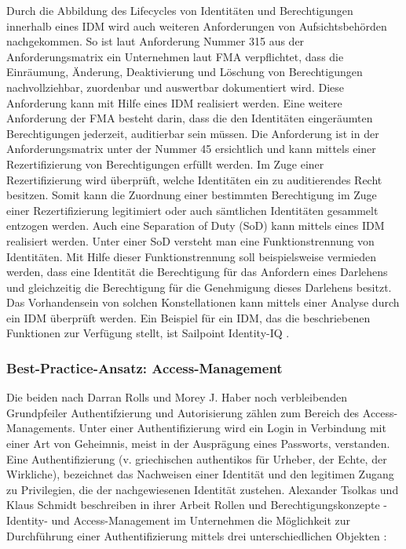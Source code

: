 Durch die Abbildung des Lifecycles von Identitäten und Berechtigungen innerhalb eines IDM wird auch weiteren Anforderungen von Aufsichtsbehörden nachgekommen. So ist laut Anforderung Nummer 315 aus der Anforderungsmatrix ein Unternehmen laut FMA verpflichtet, dass die Einräumung, Änderung, Deaktivierung und Löschung von Berechtigungen nachvollziehbar, zuordenbar und auswertbar dokumentiert wird. Diese Anforderung kann mit Hilfe eines IDM realisiert werden.
\bigbreak
Eine weitere Anforderung der FMA besteht darin, dass die den Identitäten eingeräumten Berechtigungen jederzeit, auditierbar sein müssen. Die Anforderung ist in der Anforderungsmatrix unter der Nummer 45 ersichtlich und kann mittels einer Rezertifizierung von Berechtigungen erfüllt werden. Im Zuge einer Rezertifizierung wird überprüft, welche Identitäten ein zu auditierendes Recht besitzen. Somit kann die Zuordnung einer bestimmten Berechtigung im Zuge einer Rezertifizierung legitimiert oder auch sämtlichen Identitäten gesammelt entzogen werden. Auch eine \glqq{}Separation of Duty\grqq{} (SoD) kann mittels eines IDM realisiert werden. Unter einer SoD versteht man eine Funktionstrennung von Identitäten. Mit Hilfe dieser Funktionstrennung soll beispielsweise vermieden werden, dass eine Identität die Berechtigung für das Anfordern eines Darlehens und gleichzeitig die Berechtigung für die Genehmigung dieses Darlehens besitzt. Das Vorhandensein von solchen Konstellationen kann mittels einer Analyse durch ein IDM überprüft werden.
\bigbreak
Ein Beispiel für ein IDM, das die beschriebenen Funktionen zur Verfügung stellt, ist \glqq{}Sailpoint Identity-IQ\grqq{} \autocite{Sailpoint_Identity_IQ}.

\subsubsection{Best-Practice-Ansatz: Access-Management}
Die beiden nach Darran Rolls und Morey J. Haber noch verbleibenden Grundpfeiler \glqq{}Authentifzierung\grqq{} und \glqq{}Autorisierung\grqq{} zählen zum Bereich des Access-Managements. 
\bigbreak
Unter einer Authentifizierung wird ein Login in Verbindung mit einer Art von Geheimnis, meist in der Ausprägung eines Passworts, verstanden. Eine Authentifizierung (v. griechischen \glqq{}authentikos\grqq{} für Urheber, der Echte, der Wirkliche), bezeichnet das Nachweisen einer Identität und den legitimen Zugang zu Privilegien, die der nachgewiesenen Identität zustehen. Alexander Tsolkas und Klaus Schmidt beschreiben in ihrer Arbeit \glqq{}Rollen und Berechtigungskonzepte - Identity- und Access-Management im Unternehmen\grqq{} die Möglichkeit zur Durchführung einer Authentifizierung mittels drei unterschiedlichen Objekten \autocite{TsolkasAlexander2010RuB:}: 

